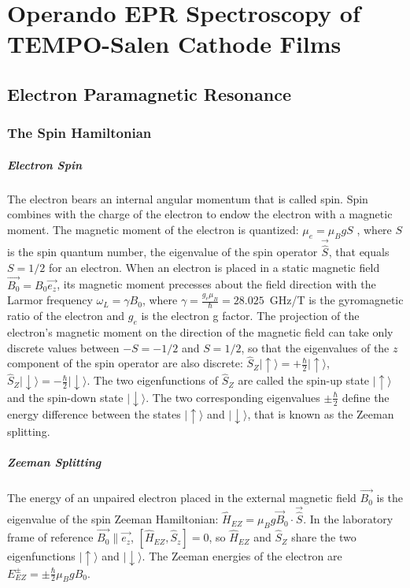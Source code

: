 \chapter{Operando EPR Spectroscopy of TEMPO-Salen Cathode Films}
\section{Electron Paramagnetic Resonance}
\subsection{The Spin Hamiltonian}
\paragraph*{Electron Spin}
The electron bears an internal angular momentum that is called spin. Spin combines with the charge of the electron to endow the electron with a magnetic moment. The magnetic moment of the electron is quantized: $\mu_e=\mu_BgS$ \cite{SternGerlach1922}, where $S$ is the spin quantum number, the eigenvalue of the spin operator $\vec{\hat{S}}$, that equals $S=1/2$ for an electron. When an electron is placed in a static magnetic field $\vec{B_0}=B_0 \vec{e_z}$, its magnetic moment precesses about the field direction with the Larmor frequency $\omega_L = \gamma B_0$, where $\gamma=\frac{g_e\mu_B}{\hbar}=28.025$~GHz/T is the gyromagnetic ratio of the electron and $g_e$ is the electron g factor. The projection of the electron's magnetic moment on the direction of the magnetic field can take only discrete values between $-S=-1/2$ and $S=1/2$, so that the eigenvalues of the $z$ component of the spin operator are also discrete: $\hat{S}_Z\vert{\uparrow\rangle}=+\frac{\hbar}{2}\vert{\uparrow\rangle}$, $\hat{S}_Z\vert{\downarrow\rangle}=-\frac{\hbar}{2}\vert{\downarrow\rangle}$. The two eigenfunctions of $\hat{S}_Z$ are called the spin-up state $\vert{\uparrow\rangle}$ and the spin-down state $\vert{\downarrow\rangle}$. The two corresponding eigenvalues $\pm\frac{\hbar}{2}$ define the energy difference between the states $\vert{\uparrow\rangle}$ and $\vert{\downarrow\rangle}$, that is known as the Zeeman splitting.

\paragraph*{Zeeman Splitting}
The energy of an unpaired electron placed in the external magnetic field $\vec{B_0}$ is the eigenvalue of the spin Zeeman Hamiltonian: $\hat{H}_{EZ} = \mu_B g\vec{B}_0\cdot\vec{\hat{S}}$. In the laboratory frame of reference $\vec{B_0}\parallel\vec{e_z}$, $\left[\hat{H}_{EZ},\hat{S}_z\right]=0$, so $\hat{H}_{EZ}$ and $\hat{S}_Z$ share the two eigenfunctions $\vert{\uparrow\rangle}$ and $\vert{\downarrow\rangle}$. The Zeeman energies of the electron are $E_{EZ}^{\pm} = \pm \frac{\hbar}{2}\mu_B g B_0$. 

